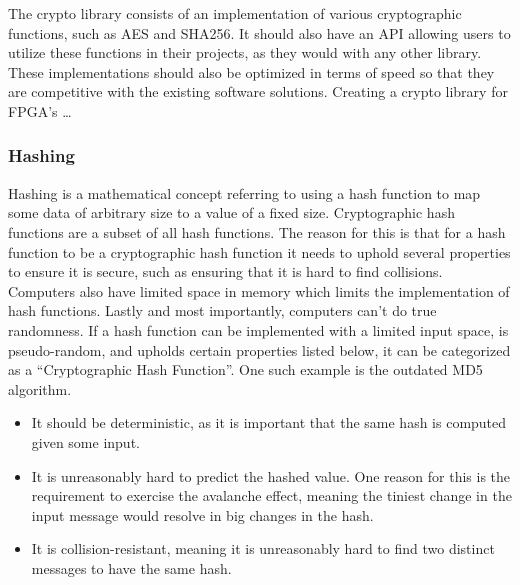 \documentclass[a4paper]{article}
\begin{document}
The crypto library consists of an implementation of various cryptographic functions, such as AES and SHA256. It should also have an API allowing users to utilize these functions in their projects, as they would with any other library.
These implementations should also be optimized in terms of speed so that they are competitive with the existing software solutions.
Creating a crypto library for FPGA's \ldots{}
\subsubsection{Hashing}
\label{sec:org8514304}
Hashing is a mathematical concept referring to using a hash function to map some data of arbitrary size to a value of a fixed size. Cryptographic hash functions are a subset of all hash functions.
The reason for this is that for a hash function to be a cryptographic hash function it needs to uphold several properties to ensure it is secure, such as ensuring that it is hard to find collisions. Computers also have limited space in memory which limits the implementation of hash functions. Lastly and most importantly, computers can't do true randomness.
If a hash function can be implemented with a limited input space, is pseudo-random, and upholds certain properties listed below, it can be categorized as a ``Cryptographic Hash Function''. One such example is the outdated MD5 algorithm.
\begin{itemize}
\item It should be deterministic, as it is important that the same hash is computed given some input.
\item It is unreasonably hard to predict the hashed value. One reason for this is the requirement to exercise the avalanche effect, meaning the tiniest change in the input message would resolve in big changes in the hash.
\item It is collision-resistant, meaning it is unreasonably hard to find two distinct messages to have the same hash.
\end{itemize}
\end{document}

